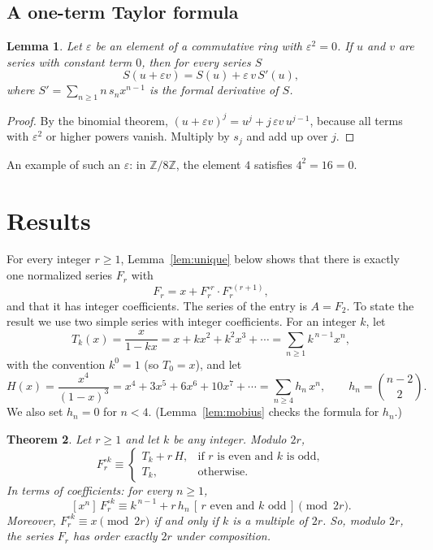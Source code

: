 \documentclass[11pt,a4paper]{article}
\newtheorem{theorem}{Theorem}[section]
\newtheorem{lemma}[theorem]{Lemma}
\theoremstyle{definition}
\theoremstyle{remark}
\newcommand{\Z}{\mathbb{Z}}
\newcommand{\coeff}[2]{[x^{#1}]\,#2}
\begin{document}
\subsection{A one-term Taylor formula}
\begin{lemma}\label{lem:taylor}
Let $\varepsilon$ be an element of a commutative ring with $\varepsilon^2=0$. If $u$ and $v$ are series with constant
term $0$, then for every series $S$
\[
S(u+\varepsilon v)=S(u)+\varepsilon\,v\,S'(u),
\]
where $S'=\sum_{n\ge1}n\,s_nx^{n-1}$ is the formal derivative of $S$.
\end{lemma}

\begin{proof}
By the binomial theorem, $(u+\varepsilon v)^j=u^j+j\,\varepsilon v\,u^{j-1}$, because all terms with
$\varepsilon^2$ or higher powers vanish. Multiply by $s_j$ and add up over $j$.
\end{proof}
An example of such an $\varepsilon$: in $\Z/8\Z$, the element $4$ satisfies $4^2=16=0$.

\section{Results}\label{sec:results}

For every integer $r\ge1$, Lemma~\ref{lem:unique} below shows that there is exactly one normalized series $F_r$ with
\begin{equation}\label{eq:family}
F_r=x+F_r^{\circ r}\cdot F_r^{\circ(r+1)},
\end{equation}
and that it has integer coefficients. The series of the entry is $A=F_{2}$. To state the result we use
two simple series with integer coefficients. For an integer $k$, let
\[
T_k(x)=\frac{x}{1-kx}=x+kx^2+k^2x^3+\cdots=\sum_{n\ge1}k^{\,n-1}x^n ,
\]
with the convention $k^0=1$ (so $T_0=x$), and let
\[
H(x)=\frac{x^4}{(1-x)^3}=x^4+3x^5+6x^6+10x^7+\cdots=\sum_{n\ge4}h_n\,x^n,\qquad h_n=\binom{n-2}{2}.
\]
We also set $h_n=0$ for $n<4$. (Lemma~\ref{lem:mobius} checks the formula for $h_n$.)

\begin{theorem}\label{thm:general}
Let $r\ge1$ and let $k$ be any integer. Modulo $2r$,
\[
F_r^{\circ k}\equiv
\begin{cases}
T_k+r\,H, & \text{if $r$ is even and $k$ is odd},\\
T_k, & \text{otherwise}.
\end{cases}
\]
In terms of coefficients: for every $n\ge1$,
\[
\coeff{n}{F_r^{\circ k}}\equiv k^{\,n-1}+r\,h_n\,[\,r\text{ even and }k\text{ odd}\,]\pmod{2r}.
\]
Moreover, $F_r^{\circ k}\equiv x\pmod{2r}$ if and only if $k$ is a multiple of $2r$. So, modulo $2r$, the series $F_r$
has order exactly $2r$ under composition.
\end{theorem}
\end{document}
